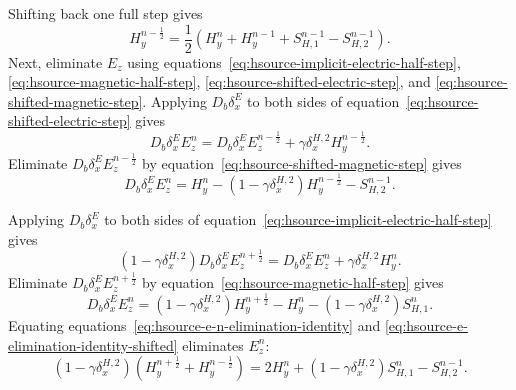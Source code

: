 \documentclass{article}
\numberwithin{figure}{section}
\begin{document}
Shifting back one full step gives
\begin{equation}
    H_y^{n-\frac{1}{2}}=\frac{1}{2}\left(H_y^n+H_y^{n-1}+S_{H,1}^{n-1}-S_{H,2}^{n-1}\right). \label{eq:hsource-h-only-first-half-shifted}
\end{equation}
Next, eliminate $E_z$ using equations~\eqref{eq:hsource-implicit-electric-half-step}, \eqref{eq:hsource-magnetic-half-step}, \eqref{eq:hsource-shifted-electric-step}, and \eqref{eq:hsource-shifted-magnetic-step}. Applying $D_b\delta_x^E$ to both sides of equation~\eqref{eq:hsource-shifted-electric-step} gives
\begin{equation}
    D_b\delta_x^E E_z^n=D_b\delta_x^E E_z^{n-\frac{1}{2}}+\gamma\delta_x^{H,2}H_y^{n-\frac{1}{2}}. \label{eq:hsource-e-substitution-shifted}
\end{equation}
Eliminate $D_b\delta_x^E E_z^{n-\frac{1}{2}}$ by equation~\eqref{eq:hsource-shifted-magnetic-step} gives
\begin{equation}
    D_b\delta_x^E E_z^n=H_y^n-\left(1-\gamma\delta_x^{H,2}\right)H_y^{n-\frac{1}{2}}-S_{H,2}^{n-1}. \label{eq:hsource-e-elimination-identity-shifted}
\end{equation}




Applying $D_b\delta_x^E$ to both sides of equation~\eqref{eq:hsource-implicit-electric-half-step} gives
\begin{equation}
    \left(1-\gamma\delta_x^{H,2}\right)D_b\delta_x^E E_z^{n+\frac{1}{2}}=D_b\delta_x^E E_z^n+\gamma\delta_x^{H,2}H_y^n. \label{eq:hsource-applied-implicit-electric-step}
\end{equation}
Eliminate $D_b\delta_x^E E_z^{n+\frac{1}{2}}$ by equation~\eqref{eq:hsource-magnetic-half-step} gives
\begin{equation}
    D_b\delta_x^E E_z^n=\left(1-\gamma\delta_x^{H,2}\right)H_y^{n+\frac{1}{2}}-H_y^n-\left(1-\gamma\delta_x^{H,2}\right)S_{H,1}^n. \label{eq:hsource-e-n-elimination-identity}
\end{equation}
Equating equations~\eqref{eq:hsource-e-n-elimination-identity} and \eqref{eq:hsource-e-elimination-identity-shifted} eliminates $E_z^n$:
\begin{equation}
    \left(1-\gamma\delta_x^{H,2}\right)\left(H_y^{n+\frac{1}{2}}+H_y^{n-\frac{1}{2}}\right)=2H_y^n+\left(1-\gamma\delta_x^{H,2}\right)S_{H,1}^n-S_{H,2}^{n-1}. \label{eq:hsource-h-only-centered}
\end{equation}
\end{document}
